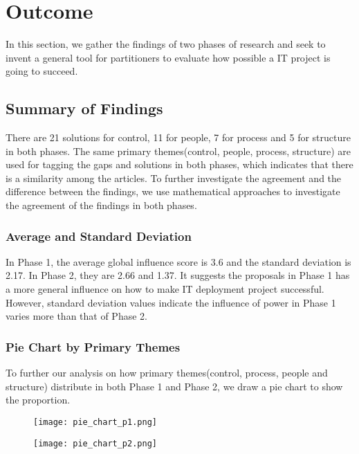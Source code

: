 
\section{Outcome}
In this section, we gather the findings of two phases of research and seek to invent a general tool for partitioners to evaluate how possible a IT project is going to succeed.


\subsection{Summary of Findings}
There are 21 solutions for control, 11 for people, 7 for process and 5 for structure in both phases. The same primary themes(control, people, process, structure) are used for tagging the gaps and solutions in both phases, which indicates that there is a similarity among the articles. To further investigate the agreement and the difference between the findings, we use mathematical approaches to investigate the agreement of the findings in both phases.

\subsubsection{Average and Standard Deviation}
In Phase 1, the average global influence score is 3.6 and the standard deviation is 2.17. In Phase 2, they are 2.66 and 1.37. It suggests the proposals in Phase 1 has a more general influence on how to make IT deployment project successful. However, standard deviation values indicate the influence of power in Phase 1 varies more than that of Phase 2.
\subsubsection{Pie Chart by Primary Themes}
To further our analysis on how primary themes(control, process, people and structure) distribute in both Phase 1 and Phase 2, we draw a pie chart to show the proportion.

\begin{figure}[!ht]
\centering
\begin{minipage}{.5\textwidth}
  \centering
  \texttt{[image: pie\_chart\_p1.png]}
  \label{pie:1}
\end{minipage}%
\begin{minipage}{.5\textwidth}
  \centering
  \texttt{[image: pie\_chart\_p2.png]}
  \label{pie:2}
\end{minipage}
\end{figure}

